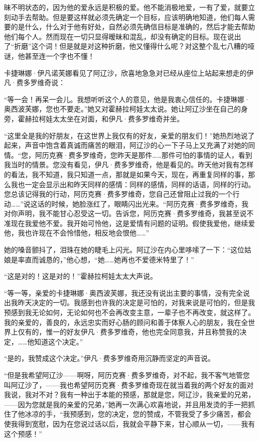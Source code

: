 昧不明状态的，因为他的爱永远是积极的爱。他不能消极地爱，一有了爱，就要立刻动手去帮助。但是要这样就必须先确定一个目标，应该明确地知道，他们每人需要的是什么，什么对于他有好处，自然必须先确信目标是准确的，然后才能去帮助他们每个人。然而现在一切只显得暧昧和混乱，却没有确定的目标。现在说出了“折磨”这个词！但是就是对这种折磨，他又懂得什么呢？对这整个乱七八糟的哑谜，他甚至连一个字也不懂！
\par 卡捷琳娜·伊凡诺芙娜看见了阿辽沙，欣喜地急急对已经从座位上站起来想走的伊凡·费多罗维奇说：
\par “等一会！再呆一会儿。我想听听这个人的意见，他是我衷心信任的。卡捷琳娜·奥西波芙娜，您也不要走。”她又对霍赫拉柯娃太太说。她让阿辽沙坐在自己的身旁，霍赫拉柯娃太太坐在对面，和伊凡·费多罗维奇并坐。
\par “这里全是我的好朋友，在这世界上我仅有的好友，亲爱的朋友们！”她热烈地说了起来，声音中饱含着真诚而痛苦的眼泪，阿辽沙的心一下子马上又充满了对她的同情。“您，阿历克赛·费多罗维奇，您昨天是那件……那件可怕的事情的证人，看到我当时的情景。您没有看见，伊凡·费多罗维奇，他是看见的。昨天他对我有怎样的看法，我不知道，我只知道一点，那就是如果今天，现在，再重复同样的事，那么我也一定会显示出和昨天同样的感情：同样的感情，同样的话语，同样的行动。您总该记得我的行动，阿历克赛·费多罗维奇，您自己还曾阻止过我的一个行动……”说这话的时候，她脸涨红了，眼睛闪出光来。“阿历克赛·费多罗维奇，我对你声明，我不能甘心忍受这一切。告诉您，阿历克赛·费多罗维奇，我甚至说不准现在我爱他不爱。我开始可怜他，这是爱情有问题的证明。假使我爱他，继续爱他，我也许现在不会怜惜他，相反地会恨他……”
\par 她的嗓音颤抖了，泪珠在她的睫毛上闪光。阿辽沙在内心里哆嗦了一下：“这位姑娘是率直而诚恳的，”他心想，“她……她再也不爱德米特里了！”
\par “这是对的！这是对的！”霍赫拉柯娃太太大声说。
\par “等一等，亲爱的卡捷琳娜·奥西波芙娜，我还没有说出主要的事情，没有完全说出我昨天决定的一切。我感到也许我的决定是可怕的，对我来说是可怕的，但是我预感到我无论如何，无论如何也不会再改变主意，一辈子也不再改变，就这样了。我的亲爱的，善良的，永远忠实而好心肠的顾问和善于体察人心的朋友，我在全世界上仅有的，惟一的好友伊凡·费多罗维奇，他也完全同意我，并且称赞我的决定，……他知道这个决定。”
\par “是的，我赞成这个决定。”伊凡·费多罗维奇用沉静而坚定的声音说。
\par “但是我希望阿辽沙——啊呀，阿历克赛·费多罗维奇，对不起，我不客气地管您叫阿辽沙了，——我也希望阿历克赛·费多罗维奇现在就当着我的两个好友的面对我说，我对不对？我有一种出于本能的预感，那就是您，阿辽沙，我亲爱的兄弟，——因为您就是我的亲爱的兄弟，”她再一次满心欢喜地说，并且用发烫的手一把抓住了他冰凉的手，“我预感到，您的决定，您的赞成，不管我受了多少痛苦，都会使我得到宽慰，因为在您说过话以后，我就会平静下来，甘心顺从一切，——我有这个预感！”
